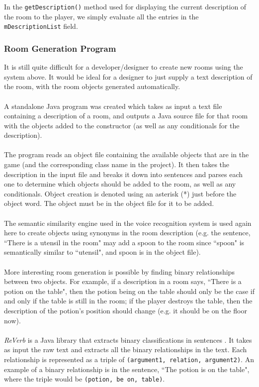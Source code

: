 \documentclass[11pt]{article}
\begin{document}
In the \texttt{getDescription()} method used for displaying the current description of the room to the player, we simply evaluate all the entries in the \texttt{mDescriptionList} field.

\subsubsection{Room Generation Program}

It is still quite difficult for a developer/designer to create new rooms using the system above. It would be ideal for a designer to just supply a text description of the room, with the room objects generated automatically.
\\
\\
A standalone Java program was created which takes as input a text file containing a description of a room, and outputs a Java source file for that room with the objects added to the constructor (as well as any conditionals for the description).
\\
\\
The program reads an object file containing the available objects that are in the game (and the corresponding class name in the project). It then takes the description in the input file and breaks it down into sentences and parses each one to determine which objects should be added to the room, as well as any conditionals. Object creation is denoted using an asterisk (*) just before the object word. The object must be in the object file for it to be added.
\\
\\
The semantic similarity engine used in the voice recognition system is used again here to create objects using synonyms in the room description (e.g. the sentence, ``There is a utensil in the room" may add a spoon to the room since ``spoon" is semantically similar to ``utensil", and spoon is in the object file).
\\
\\
More interesting room generation is possible by finding binary relationships between two objects. For example, if a description in a room says, ``There is a potion on the table", then the potion being on the table should only be the case if and only if the table is still in the room; if the player destroys the table, then the description of the potion's position should change (e.g. it should be on the floor now).
\\
\\
\textit{ReVerb} is a Java library that extracts binary classifications in sentences \cite{ReVerb2011}. It takes as input the raw text and extracts all the binary relationships in the text. Each relationship is represented as a triple of \texttt{(argument1, relation, argument2)}. An example of a binary relationship is in the sentence, ``The potion is on the table", where the triple would be \texttt{(potion, be on, table)}.
\end{document}
